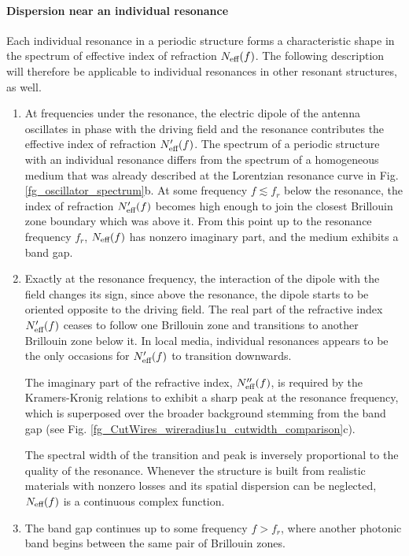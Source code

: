 \paragraph{Dispersion near an individual resonance}%
Each individual resonance in a periodic structure forms a characteristic shape in the spectrum of effective index of refraction $N_{\text{eff} }(f)$. The following description will therefore be applicable to individual resonances in other resonant structures, as well. 

\begin{enumerate}
\item{At frequencies under the resonance, the electric dipole of the antenna oscillates in phase with the driving field and the resonance contributes the effective index of refraction $N_{\text{eff} }'(f)$. 
The spectrum of a periodic structure with an individual resonance differs from the spectrum of a homogeneous medium that was already described at the Lorentzian resonance curve in Fig. \ref{fg_oscillator_spectrum}b.
At some frequency $f \lesssim f_r$ below the resonance, the index of refraction $N_{\text{eff} }'(f)$ becomes high enough to join the closest Brillouin zone boundary which was above it. From this point up to the resonance frequency $f_r$, $N_{\text{eff} }(f)$ has nonzero imaginary part, and the medium exhibits a band gap.
} 
\item{Exactly at the resonance frequency, the interaction of the dipole with the field changes its sign, since above the resonance, the dipole starts to be oriented opposite to the driving field. 
The real part of the refractive index $N_{\text{eff} }'(f)$ ceases to follow one Brillouin zone and transitions to another Brillouin zone below it. In local media, individual resonances appears to be the only occasions for $N_{\text{eff} }'(f)$ to transition downwards.

The imaginary part of the refractive index, $N_{\text{eff} }''(f)$, is required by the Kramers-Kronig relations to exhibit a sharp peak at the resonance frequency, which is superposed over the broader background stemming from the band gap (see Fig. \ref{fg_CutWires_wireradius1u_cutwidth_comparison}c). 

The spectral width of the transition and peak is inversely proportional to the quality of the resonance. Whenever the structure is built from realistic materials with nonzero losses and its spatial dispersion can be neglected, $N_{\text{eff} }(f)$ is a continuous complex function.
} 
\item{The band gap continues up to some frequency $f > f_r$, where another photonic band begins between the same pair of Brillouin zones.  
} 
\end{enumerate}

